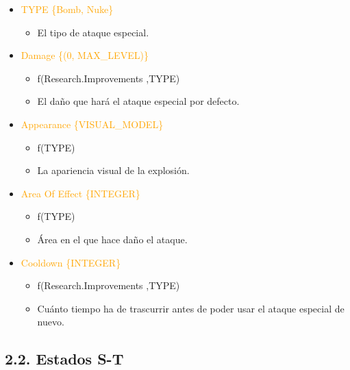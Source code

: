 \documentclass{article}
\begin{document}
\begin{itemize}
    \item \textcolor{Orange}{TYPE \{Bomb, Nuke\}}
    \begin{itemize}
        \item El tipo de ataque especial.
    \end{itemize}
    \item \textcolor{Orange}{Damage \{(0, MAX\_LEVEL)\}}
    \begin{itemize}
        \item f(Research.Improvements ,TYPE)
        \item El daño que hará el ataque especial por defecto.
    \end{itemize}
    \item \textcolor{Orange}{Appearance \{VISUAL\_MODEL\}}
    \begin{itemize}
        \item f(TYPE)
        \item La apariencia visual de la explosión.
    \end{itemize}
    \item \textcolor{Orange}{Area Of Effect \{INTEGER\}}
    \begin{itemize}
        \item f(TYPE)
        \item Área en el que hace daño el ataque.
    \end{itemize}
    \item \textcolor{Orange}{Cooldown \{INTEGER\}}
    \begin{itemize}
        \item f(Research.Improvements ,TYPE)
        \item Cuánto tiempo ha de trascurrir antes de poder usar el ataque especial de nuevo.
    \end{itemize}
\end{itemize}

\clearpage

\subsection{2.2. Estados S-T}
\end{document}
